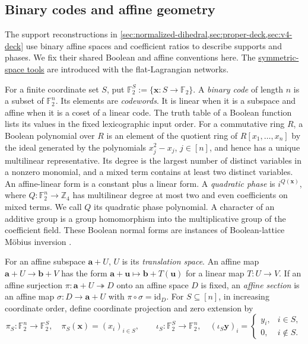 \documentclass[11pt,letterpaper,onecolumn]{article}
\theoremstyle{plain}
\theoremstyle{definition}
\theoremstyle{remark}
\newcommand{\Ftwo}{\mathbb F_2}
\begin{document}
\subsection{Binary codes and affine geometry}
\label{subsec:binary-affine-conventions}

The support reconstructions in
\cref{sec:normalized-dihedral,sec:proper-deck,sec:v4-deck} use binary
affine spaces and coefficient ratios to describe supports and phases.
We fix their shared Boolean and affine conventions here. The
\hyperref[subsubsec:symmetric-binary-spaces]{symmetric-space tools}
are introduced with the flat-Lagrangian networks.

\label{subsubsec:boolean-affine-tools}

For a finite coordinate set \(S\), put
\(\Ftwo^S:=\{{\mathbf{x}}:S\to\Ftwo\}\).  A \emph{binary code} of length \(n\) is a
subset of \(\Ftwo^n\). Its elements are \emph{codewords}.  It is linear when
it is a subspace and affine when it is a coset of a linear code.  The truth
table of a Boolean function lists its values in the fixed lexicographic input
order.  For a commutative ring \(R\), a Boolean polynomial over \(R\) is an
element of the quotient ring of \(R[x_1,\ldots,x_n]\) by the ideal generated
by the polynomials \(x_j^2-x_j\), \(j\in[n]\), and hence has a unique
multilinear representative.  Its degree is the largest number of
distinct variables in a nonzero monomial, and a mixed term contains at least
two distinct variables.  An affine-linear form is a constant plus a linear
form.  A \emph{quadratic phase} is \(i^{Q({\mathbf{x}})}\), where
\(Q:\Ftwo^n\to\mathbb Z_4\) has multilinear degree at most two and even
coefficients on mixed terms. We call \(Q\) its quadratic phase polynomial. A character of an additive group is a group
homomorphism into the multiplicative group of the coefficient field.  These
Boolean normal forms are instances of Boolean-lattice Möbius inversion
\cite[Chapters~1--2]{Carlet2021}.

For an affine subspace \({\mathbf{a}}+U\), \(U\) is its \emph{translation space}.
An affine map \({\mathbf{a}}+U\to {\mathbf{b}}+V\) has the form
\({\mathbf{a}}+{\mathbf{u}}\mapsto {\mathbf{b}}+T({\mathbf{u}})\) for a linear map \(T:U\to V\).  If an affine surjection
\(\pi:{\mathbf{a}}+U\twoheadrightarrow D\) onto an affine space \(D\) is fixed, an
\emph{affine section} is an
affine map \(\sigma:D\to {\mathbf{a}}+U\) with
\(\pi\circ\sigma=\mathrm{id}_D\).  For \(S\subseteq[n]\), in increasing
coordinate order, define coordinate projection and zero extension by
\[
 \pi_S:\Ftwo^n\to\Ftwo^S,\quad \pi_S({\mathbf{x}})=(x_i)_{i\in S},
 \qquad
 \iota_S:\Ftwo^S\to\Ftwo^n,\quad
 (\iota_S{\mathbf{y}})_i=\begin{cases}y_i,&i\in S,\\0,&i\notin S.\end{cases}
\]
\end{document}
